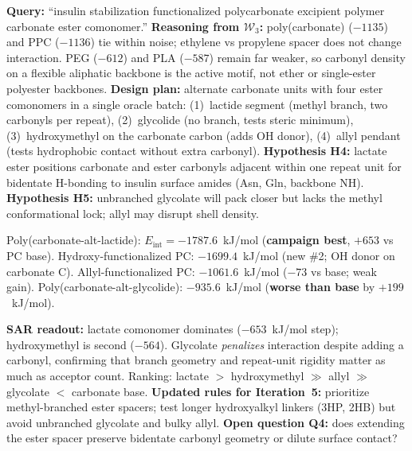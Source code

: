 \documentclass[twocolumn]{fairmeta}
\begin{document}
\begin{agentthought}
\scriptsize
\textbf{Query:} ``insulin stabilization functionalized polycarbonate excipient polymer carbonate ester comonomer.''
\textbf{Reasoning from $\mathcal{W}_3$:} poly(carbonate) ($-1135$) and PPC ($-1136$) tie within noise; ethylene vs propylene spacer does not change interaction.
PEG ($-612$) and PLA ($-587$) remain far weaker, so carbonyl density on a flexible aliphatic backbone is the active motif, not ether or single-ester polyester backbones.
\textbf{Design plan:} alternate carbonate units with four ester comonomers in a single oracle batch:
(1)~lactide segment (methyl branch, two carbonyls per repeat),
(2)~glycolide (no branch, tests steric minimum),
(3)~hydroxymethyl on the carbonate carbon (adds OH donor),
(4)~allyl pendant (tests hydrophobic contact without extra carbonyl).
\textbf{Hypothesis H4:} lactate ester positions carbonate and ester carbonyls adjacent within one repeat unit for bidentate H-bonding to insulin surface amides (Asn, Gln, backbone NH).
\textbf{Hypothesis H5:} unbranched glycolate will pack closer but lacks the methyl conformational lock; allyl may disrupt shell density.
\end{agentthought}

\begin{toolcall}
\scriptsize
Poly(carbonate-alt-lactide): $E_\text{int} = -1787.6$~kJ/mol (\textbf{campaign best}, $+653$ vs PC base).
Hydroxy-functionalized PC: $-1699.4$~kJ/mol (new \#2; OH donor on carbonate C).
Allyl-functionalized PC: $-1061.6$~kJ/mol ($-73$ vs base; weak gain).
Poly(carbonate-alt-glycolide): $-935.6$~kJ/mol (\textbf{worse than base} by $+199$~kJ/mol).
\end{toolcall}

\begin{agentthought}
\scriptsize
\textbf{SAR readout:} lactate comonomer dominates ($-653$~kJ/mol step); hydroxymethyl is second ($-564$).
Glycolate \emph{penalizes} interaction despite adding a carbonyl, confirming that branch geometry and repeat-unit rigidity matter as much as acceptor count.
Ranking: lactate $>$ hydroxymethyl $\gg$ allyl $\gg$ glycolate $<$ carbonate base.
\textbf{Updated rules for Iteration~5:} prioritize methyl-branched ester spacers; test longer hydroxyalkyl linkers (3HP, 2HB) but avoid unbranched glycolate and bulky allyl.
\textbf{Open question Q4:} does extending the ester spacer preserve bidentate carbonyl geometry or dilute surface contact?
\end{agentthought}
\end{document}

